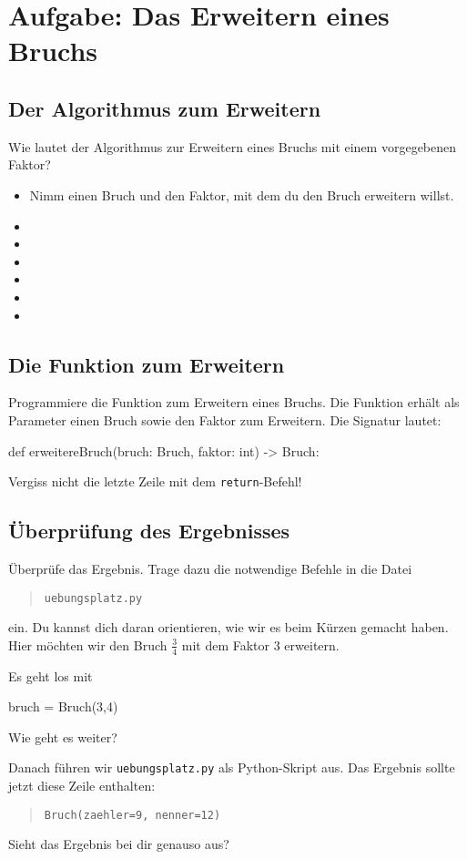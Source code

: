 \section{Aufgabe: Das Erweitern eines Bruchs}

\subsection*{Der Algorithmus zum Erweitern}

Wie lautet der Algorithmus zur Erweitern eines Bruchs mit einem vorgegebenen Faktor?

{\huge
\begin{itemize}
	\item Nimm einen Bruch und den Faktor, mit dem du den Bruch erweitern willst.
	\item  
	\item  
	\item  
	\item 
	\item  
	\item  
\end{itemize}
}

\subsection*{Die Funktion zum Erweitern}

Programmiere die Funktion zum Erweitern eines Bruchs. Die Funktion erhält als Parameter einen Bruch sowie den Faktor zum Erweitern. Die Signatur lautet:

\begin{codePython}
def erweitereBruch(bruch: Bruch, faktor: int) -> Bruch:
\end{codePython}

Vergiss nicht die letzte Zeile mit dem \texttt{return}-Befehl!

\subsection*{Überprüfung des Ergebnisses}

Überprüfe das Ergebnis. Trage dazu die notwendige Befehle in die Datei
\begin{quote}
	\texttt{uebungsplatz.py}
\end{quote}
ein. Du kannst dich daran orientieren, wie wir es beim Kürzen gemacht haben. Hier möchten wir den Bruch $\frac{3}{4}$ mit dem Faktor 3 erweitern.

Es geht los mit

\begin{codePython}
	bruch = Bruch(3,4)
\end{codePython}

Wie geht es weiter?

Danach führen wir \texttt{uebungsplatz.py} als Python-Skript aus. Das Ergebnis sollte jetzt diese Zeile enthalten:
\begin{quote}
	\texttt{Bruch(zaehler=9, nenner=12)}
\end{quote}

Sieht das Ergebnis bei dir genauso aus?
